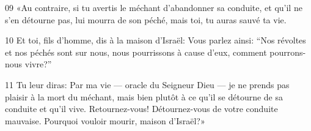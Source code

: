 
09 «Au contraire, si tu avertis le méchant d’abandonner sa conduite, et qu’il ne s’en détourne pas, lui mourra de son péché, mais toi, tu auras sauvé ta vie.

10 Et toi, fils d’homme, dis à la maison d’Israël: Vous parlez ainsi: “Nos révoltes et nos péchés sont sur nous, nous pourrissons à cause d’eux, comment pourrons-nous vivre?”

11 Tu leur diras: Par ma vie --- oracle du Seigneur Dieu --- je ne prends pas plaisir à la mort du méchant, mais bien plutôt à ce qu’il se détourne de sa conduite et qu’il vive. Retournez-vous! Détournez-vous de votre conduite mauvaise. Pourquoi vouloir mourir, maison d’Israël?»
